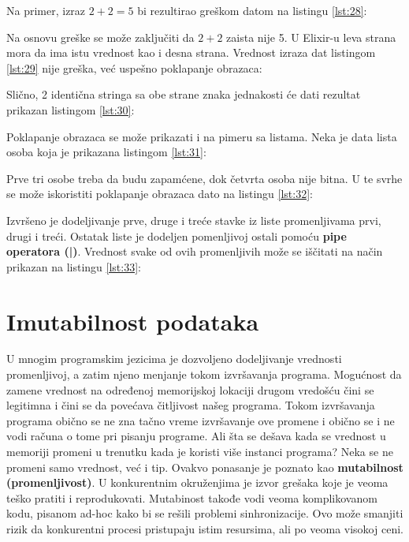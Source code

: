 \documentclass[12pt,oneside]{memoir}
\begin{document}
Na primer, izraz $2 + 2 = 5$ bi rezultirao greškom datom na listingu \ref{lst:28}:



Na osnovu greške se može zaključiti da $2 + 2$ zaista nije 5. U Elixir-u leva strana mora da ima istu vrednost kao i desna strana. Vrednost izraza dat listingom \ref{lst:29} nije greška, već uspešno poklapanje obrazaca:



Slično, 2 identična stringa sa obe strane znaka jednakosti će dati rezultat prikazan listingom \ref{lst:30}:



Poklapanje obrazaca se može prikazati i na pimeru sa listama. Neka je data lista osoba koja je prikazana listingom \ref{lst:31}:



Prve tri osobe treba da budu zapamćene, dok četvrta osoba nije bitna. U te svrhe se može iskoristiti poklapanje obrazaca dato na listingu \ref{lst:32}:



Izvršeno je dodeljivanje prve, druge i treće stavke iz liste promenljivama prvi, drugi i treći. Ostatak liste je dodeljen pomenljivoj ostali pomoću \textbf{pipe operatora (|)}. Vrednost svake od ovih promenljivih može se iščitati na način prikazan na listingu \ref{lst:33}:



\newpage

\section{Imutabilnost podataka}

U mnogim programskim jezicima je dozvoljeno dodeljivanje vrednosti promenljivoj, a zatim njeno menjanje tokom izvršavanja programa. Mogućnost da zamene vrednost na određenoj memorijskoj lokaciji drugom vredošću čini se legitimna i čini se da povećava čitljivost našeg programa. Tokom izvršavanja programa obično se ne zna tačno vreme izvršavanje ove promene i obično se i ne vodi računa o tome pri pisanju programe. Ali šta se dešava kada se vrednost u memoriji promeni u trenutku kada je koristi više instanci programa? Neka se ne promeni samo vrednost, već i tip. Ovakvo ponasanje je poznato kao \textbf{mutabilnost (promenljivost)}. U konkurentnim okruženjima je izvor grešaka koje je veoma teško pratiti i reprodukovati. Mutabinost takođe vodi veoma komplikovanom kodu, pisanom ad-hoc kako bi se rešili problemi sinhronizacije. Ovo može smanjiti rizik da konkurentni procesi  pristupaju istim resursima, ali po veoma visokoj ceni.
\end{document}

